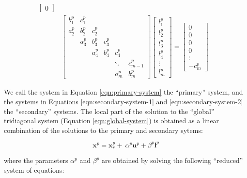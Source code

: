 \begin{align}
\begin{bmatrix}
0
\end{bmatrix} & \label{eqn:secondary-system-1} \\
%
%
%
& \begin{bmatrix}
b_1^p & c_1^p \\
a_2^p & b_2^p & c_2^p \\
      & a_3^p & b_3^p & c_3^p \\
      &       & a_4^p & b_4^p & c_4^p \\
      &       &       &       &  \ddots & c_{m-1}^p\\
      &       &       &       &     a_{m}^p  & b_{m}^p
\end{bmatrix}
\begin{bmatrix}
l_1^p \\
l_2^p \\
l_3^p \\
l_4^p \\
\vdots \\
l_m^p
\end{bmatrix}
=
\begin{bmatrix}
0 \\
0 \\
0 \\
0 \\
\vdots \\
-c_m^p
\end{bmatrix} & \label{eqn:secondary-system-2}
\end{align}

We call the system in Equation \ref{eqn:primary-system}
the ``primary'' system, and the systems in
Equations
\ref{eqn:secondary-system-1} and \ref{eqn:secondary-system-2}
the ``secondary'' systems.
The local part of the solution to the ``global'' tridiagonal system
(Equation \ref{eqn:global-system})
is obtained as a linear combination of
the solutions to the primary and secondary sytems:

\begin{equation}
    \boldsymbol{x}^p = \boldsymbol{x}_r^p + \
        \alpha^p \boldsymbol{u}^p + \beta^p \boldsymbol{l}^p
    \label{eqn:sum-of-systems}
\end{equation}

where the  parameters $\alpha^p$ and $\beta^p$ are obtained by
solving the following ``reduced'' system of equations:

